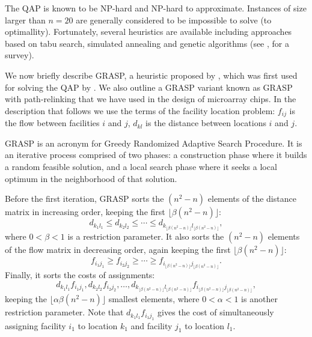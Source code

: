 \documentclass{bioinfo}
\begin{document}
The QAP is known to be NP-hard and NP-hard to approximate. Instances of size larger than $n = 20$ are generally considered to be impossible to solve (to optimallity). Fortunately, several heuristics are available including approaches based on tabu search, simulated annealing and genetic algorithms (see \citealp{CELA98}, for a survey).

We now briefly describe GRASP, a heuristic proposed by \citealp{FEO95}, which was first used for solving the QAP by \citealp{LI94}. We also outline a GRASP variant known as GRASP with path-relinking \citep{OLIVEIRA04} that we have used in the design of microarray chips. In the description that follows we use the terms of the facility location problem: $f_{ij}$ is the flow between facilities $i$ and $j$, $d_{kl}$ is the distance between locations $i$ and $j$.

GRASP is an acronym for Greedy Randomized Adaptive Search Procedure. It is an iterative process comprised of two phases: a construction phase where it builds a random feasible solution, and a local search phase where it seeks a local optimum in the neighborhood of that solution.

Before the first iteration, GRASP sorts the $(n^2 - n)$ elements of the distance matrix in increasing order, keeping the first $\lfloor \beta (n^2 - n) \rfloor$:
\begin{displaymath}
d_{k_1 l_1} \le d_{k_2 l_2} \le \cdots \le d_{k_{\lfloor \beta (n^2 - n) \rfloor} l_{\lfloor \beta (n^2 - n) \rfloor}},
\end{displaymath}
where $0 < \beta < 1$ is a restriction parameter. It also sorts the $(n^2 - n)$ elements of the flow matrix in decreasing order, again keeping the first $\lfloor \beta (n^2 - n) \rfloor$:
\begin{displaymath}
f_{i_1 j_1} \ge f_{i_2 j_2} \ge \cdots \ge f_{i_{\lfloor \beta (n^2 - n) \rfloor} j_{\lfloor \beta (n^2 - n) \rfloor}}.
\end{displaymath}
Finally, it sorts the costs of assignments:
\begin{displaymath}
d_{k_1 l_1} f_{i_1 j_1},  d_{k_2 l_2} f_{i_2 j_2}, \ldots, d_{k_{\lfloor \beta (n^2 - n) \rfloor} l_{\lfloor \beta (n^2 - n) \rfloor}} f_{i_{\lfloor \beta (n^2 - n) \rfloor} j_{\lfloor \beta (n^2 - n) \rfloor}},
\end{displaymath}
keeping the $\lfloor \alpha \beta (n^2 - n) \rfloor$ smallest elements, where $0 < \alpha < 1$ is another restriction parameter. Note that $d_{k_1 l_1} f_{i_1 j_1}$ gives the cost of simultaneously assigning facility $i_1$ to location $k_1$ and facility $j_1$ to location $l_1$.
\end{document}
